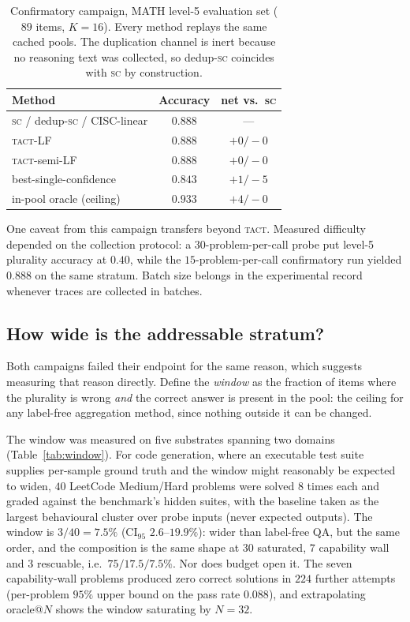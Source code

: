 \documentclass[twoside,11pt]{article}
\newcommand{\SC}{\textsc{sc}}
\newcommand{\TACT}{\textsc{tact}}
\begin{document}
\begin{table}[t]
\caption{Confirmatory campaign, MATH level-5 evaluation set ($89$ items,
$K{=}16$). Every method replays the same cached pools. The duplication
channel is inert because no reasoning text was collected, so dedup-\SC{}
coincides with \SC{} by construction.}
\label{tab:hard}
\centering\footnotesize
\setlength{\tabcolsep}{4pt}
\begin{tabular}{l c c}
\toprule
Method & Accuracy & net vs.\ \SC \\
\midrule
\SC{} / dedup-\SC{} / CISC-linear & $0.888$ & --- \\
\TACT-LF & $0.888$ & $+0/-0$ \\
\TACT-semi-LF & $0.888$ & $+0/-0$ \\
best-single-confidence & $0.843$ & $+1/-5$ \\
\midrule
in-pool oracle (ceiling) & $0.933$ & $+4/-0$ \\
\bottomrule
\end{tabular}
\end{table}

One caveat from this campaign transfers beyond \TACT. Measured difficulty
depended on the collection protocol: a $30$-problem-per-call probe put
level-5 plurality accuracy at $0.40$, while the $15$-problem-per-call
confirmatory run yielded $0.888$ on the same stratum. Batch size belongs in
the experimental record whenever traces are collected in batches.

\subsection{How wide is the addressable stratum?}\label{sec:window}
Both campaigns failed their endpoint for the same reason, which suggests
measuring that reason directly. Define the \emph{window} as the fraction of
items where the plurality is wrong \emph{and} the correct answer is present
in the pool: the ceiling for any label-free aggregation method, since nothing
outside it can be changed.

The window was measured on five substrates spanning two domains
(Table~\ref{tab:window}). For code generation, where an executable test suite
supplies per-sample ground truth and the window might reasonably be expected
to widen, $40$ LeetCode Medium/Hard problems \citep{leetcodedataset} were
solved $8$ times each and graded against the benchmark's hidden suites, with
the baseline taken as the largest behavioural cluster over probe inputs
(never expected outputs). The window is $3/40=7.5\%$ (CI$_{95}$
$2.6$--$19.9\%$): wider than label-free QA, but the same order, and the
composition is the same shape at $30$ saturated, $7$ capability wall and $3$
rescuable, i.e.\ $75/17.5/7.5\%$. Nor does budget open it. The seven capability-wall problems
produced zero correct solutions in $224$ further attempts (per-problem $95\%$
upper bound on the pass rate $0.088$), and extrapolating oracle@$N$ shows the
window saturating by $N{=}32$.
\end{document}

